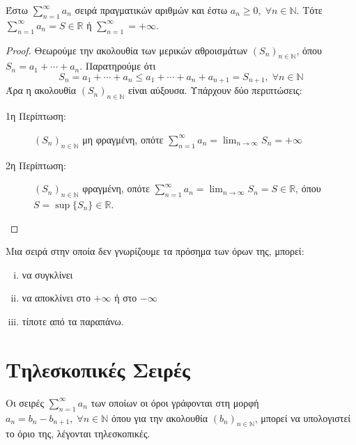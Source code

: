 \documentclass[a4paper,table]{report}
\begin{document}
\begin{mybox3}
\begin{prop}
  Έστω $ \sum_{n=1}^{\infty} a_{n} $ σειρά πραγματικών αριθμών και έστω $ a_{n} \geq 0,
  \; \forall n \in \mathbb{N} $. Τότε $ \sum_{n=1}^{\infty} a_{n} = S \in \mathbb{R} $ 
  ή $ \sum_{n=1}^{\infty} = + \infty $.
\end{prop}
\end{mybox3}
\begin{proof}
  Θεωρούμε την ακολουθία των μερικών αθροισμάτων $ (S_{n})_{n \in \mathbb{N}} $, 
  όπου $ S_{n} = a_{1}+ \cdots + a_{n} $. Παρατηρούμε ότι
  \[
    S_{n} = a_{1}+ \cdots + a_{n} \leq a_{1}+ \cdots + a_{n}+ a_{n+1} = S_{n+1} , 
    \; \forall n \in \mathbb{N}
   \] 
   Άρα η ακολουθία $ (S_{n})_{n \in \mathbb{N}} $ είναι αύξουσα. Υπάρχουν δύο
   περιπτώσεις: 
   \begin{description}
     \item [1η Περίπτωση:] $ {(S_{n})}_{n \in \mathbb{N}} $ μη φραγμένη, οπότε 
       $ \sum_{n=1}^{\infty} a_{n} = \lim_{n \to \infty} S_{n} = + \infty $ 
     \item [2η Περίπτωση:] $ {(S_{n})}_{n \in \mathbb{N}} $ φραγμένη, οπότε
       $ \sum_{n=1}^{\infty} a_{n} = \lim_{n \to \infty} S_{n} = S \in \mathbb{R} $,
       όπου $ S = \sup \{ S_{n} \} \in \mathbb{R} $.
   \end{description}
\end{proof}

\begin{rem}
    Μια σειρά στην οποία δεν γνωρίζουμε τα πρόσημα των όρων της, μπορεί:
    \begin{enumerate}[i)]
        \item να συγκλίνει
        \item να αποκλίνει στο $ + \infty $ ή στο $ - \infty $
        \item τίποτε από τα παραπάνω.
    \end{enumerate}
\end{rem}


\section{Τηλεσκοπικές Σειρές}

\begin{mybox1}
\begin{dfn}
    Οι σειρές $ \sum_{n=1}^{\infty} a_{n} $ των οποίων 
    οι όροι γράφονται στη μορφή 
    $ a_{n} = b_{n} - b_{n+1}, \; \forall n \in \mathbb{N} $ όπου για την ακολουθία
    $ {(b_{n})}_{n \in \mathbb{N}}$, μπορεί να υπολογιστεί το όριο της, λέγονται 
    τηλεσκοπικές.
\end{dfn}
\end{mybox1}
\end{document}
